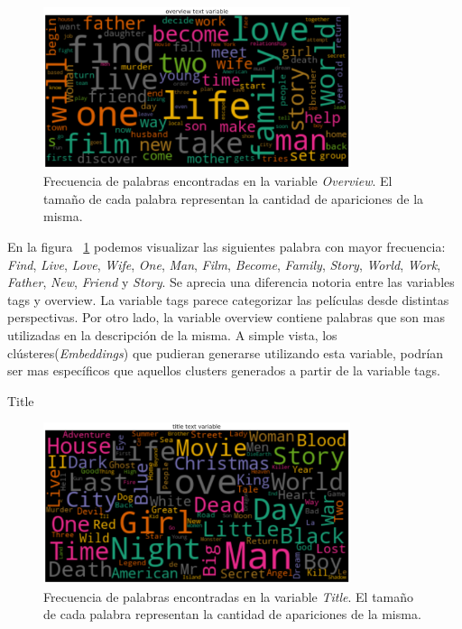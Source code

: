 \documentclass[11pt,a4paper,twoside]{thesis}
\begin{document}
\begin{figure}[h!]
	\centering
	\includegraphics[width=9cm]{./images/Cloud-Overview.png}
	\caption{Frecuencia de palabras encontradas en la variable \textit{Overview}. El tamaño de cada palabra representan la cantidad de apariciones de la misma.}
	\label{fig:tagsCloud}
\end{figure}	


En la figura ~\ref{fig:tagsCloud} podemos visualizar las siguientes palabra con mayor frecuencia: \textit{Find}, \textit{Live}, \textit{Love}, \textit{Wife}, \textit{One}, \textit{Man}, \textit{Film}, \textit{Become}, \textit{Family}, \textit{Story}, \textit{World}, \textit{Work}, \textit{Father}, \textit{New}, \textit{Friend} y \textit{Story}. Se aprecia una diferencia notoria entre las variables tags y overview. La variable tags parece categorizar las películas desde distintas perspectivas. Por otro lado, la variable overview contiene palabras que son mas utilizadas en la descripción de la misma. A simple vista, los clústeres(\textit{Embeddings}) que pudieran generarse utilizando esta variable, podrían ser mas específicos que aquellos clusters generados a partir de la variable tags.


\begin{description}
	\item[Title]
\end{description}

\begin{figure}[h!]
	\centering
	\includegraphics[width=9cm]{./images/Cloud-Title.png}
	\caption{Frecuencia de palabras encontradas en la variable \textit{Title}. El tamaño de cada palabra representan la cantidad de apariciones de la misma.}
	\label{fig:titleCloud}
\end{figure}	
\end{document}
